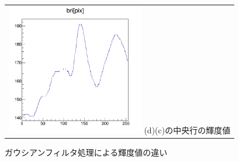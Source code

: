 \documentclass[12pt,a4paper]{jarticle}
\begin{document}
\begin{figure}[htbp]
\begin{tabular}{c}
        \begin{minipage}{0.5\hsize}
          \centering
              \includegraphics[clip, width=60mm]{gau2_hist.png}
              \hspace{1.6cm} (d)(c)の中央行の輝度値
        \end{minipage}
    
      \end{tabular}
      \caption{ガウシアンフィルタ処理による輝度値の違い\label{fig:do_gau_beforeandafter}}
\end{figure}
\newpage
\end{document}
